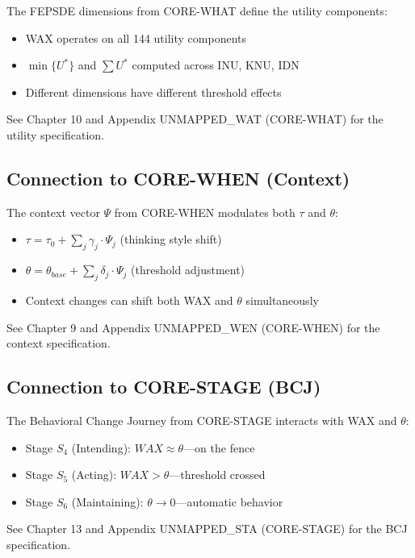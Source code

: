 \begin{cross-reference}
The FEPSDE dimensions from CORE-WHAT define the utility components:
\begin{itemize}[nosep]
  \item WAX operates on all 144 utility components
  \item $\min\{U^*\}$ and $\sum U^*$ computed across INU, KNU, IDN
  \item Different dimensions have different threshold effects
\end{itemize}
See Chapter 10 and Appendix UNMAPPED_WAT (CORE-WHAT) for the utility specification.
\end{cross-reference}

\subsection{Connection to CORE-WHEN (Context)}

\begin{cross-reference}
The context vector $\Psi$ from CORE-WHEN modulates both $\tau$ and $\theta$:
\begin{itemize}[nosep]
  \item $\tau = \tau_0 + \sum_j \gamma_j \cdot \Psi_j$ (thinking style shift)
  \item $\theta = \theta_{base} + \sum_j \delta_j \cdot \Psi_j$ (threshold adjustment)
  \item Context changes can shift both WAX and $\theta$ simultaneously
\end{itemize}
See Chapter 9 and Appendix UNMAPPED_WEN (CORE-WHEN) for the context specification.
\end{cross-reference}

\subsection{Connection to CORE-STAGE (BCJ)}

\begin{cross-reference}
The Behavioral Change Journey from CORE-STAGE interacts with WAX and $\theta$:
\begin{itemize}[nosep]
  \item Stage $S_4$ (Intending): $WAX \approx \theta$---on the fence
  \item Stage $S_5$ (Acting): $WAX > \theta$---threshold crossed
  \item Stage $S_6$ (Maintaining): $\theta \to 0$---automatic behavior
\end{itemize}
See Chapter 13 and Appendix UNMAPPED_STA (CORE-STAGE) for the BCJ specification.
\end{cross-reference}

